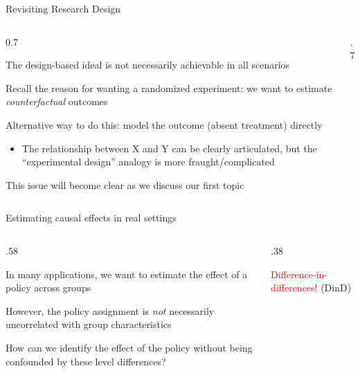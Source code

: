 \documentclass[notes,11pt, aspectratio=169]{beamer}
\newenvironment{wideitemize}{\itemize\addtolength{\itemsep}{10pt}}{\enditemize}
\begin{document}
\begin{frame}{Revisiting Research Design}
	\begin{columns}[T] %
		\begin{column}{0.7\textwidth}
			\begin{wideitemize}
				\item The design-based ideal is not necessarily achievable in all scenarios
				\item Recall the reason for wanting a randomized experiment: we want to estimate \emph{counterfactual} outcomes
				\item Alternative way to do this: model the outcome (absent treatment) directly
				\begin{itemize}
					\item The relationship between X and Y can be clearly
					      articulated, but the ``experimental design'' analogy is more fraught/complicated
				\end{itemize}
				\item This issue will become clear as we discuss our first topic
			\end{wideitemize}
		\end{column}%
		\hfill%
		\begin{column}{.7\textwidth}

		\end{column}%
	\end{columns}
\end{frame}


\begin{frame}{Estimating causal effects in real settings}
	\begin{columns}[T] %
		\begin{column}{.58\textwidth}
			\begin{wideitemize}
				\item In many applications, we want to estimate the effect of a policy across groups
				\item However, the policy assignment is  \emph{not} necessarily uncorrelated with group characteristics
				\item How can we identify the effect of the policy without being confounded by these level differences?
			\end{wideitemize}
		\end{column}%
		\hfill%
		\begin{column}{.38\textwidth}
			{\onslide<2->
				\vspace{30pt}
				\begin{center}
					\Large \textcolor{red}{Difference-in-differences!}
					\normalsize (DinD)
				\end{center}
			}
		\end{column}%
	\end{columns}
\end{frame}
\end{document}
